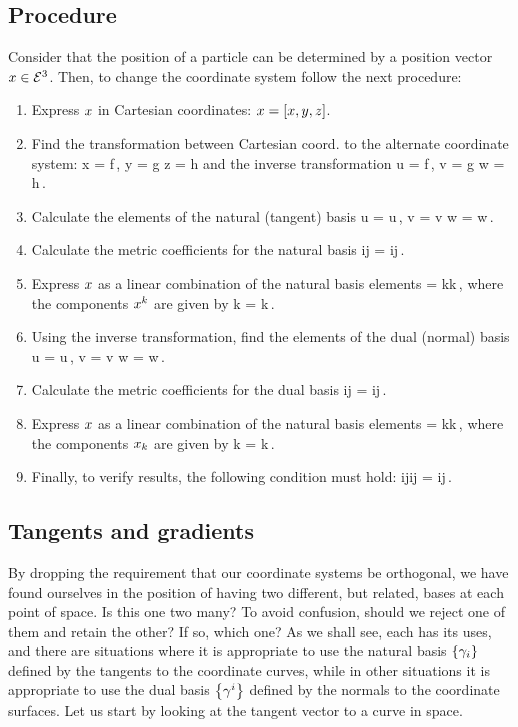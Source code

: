 \subsection{Procedure}
Consider that the position of a particle can be determined by a position vector $x\in\mathcal{E}^{3}$. Then, to change the coordinate system follow the next procedure:
\begin{enumerate}
\item Express $x$ in Cartesian coordinates: $x = \left[{x,y,z}\right]$.
%
\item Find the transformation between Cartesian coord. to the alternate coordinate system:
\beq
x = f\,,\qquad
y = g\qquad{}\qquad
z = h
\eeq
and the inverse transformation
\beq
u = f\,,\qquad
v = g\qquad{}\qquad
w = h\,.
\eeq
%
\item Calculate the elements of the natural (tangent) basis
\beq
\ifvec u = \xpd\pvec u\,,\qquad
\ifvec v = \xpd\pvec v\qquad{}\qquad
\ifvec w = \xpd\pvec w\,.
\eeq
%
\item Calculate the metric coefficients for the natural basis
\beq
\imet ij = \ifvec i\iprod\ifvec j\,.
\eeq
%
\item Express $x$ as a linear combination of the natural basis elements
\beq
\pvec = \comp\pvec k\ifvec k\,,
\eeq
where the components ${x}^{k}$ are given by
\beq
\comp\pvec k = \pvec\iprod\ifvec k\,.
\eeq
%
\item Using the inverse transformation, find the elements of the dual (normal) basis
\beq
\rfvec u = \grad u\,,\qquad
\rfvec v = \grad v\qquad{}\qquad
\rfvec w = \grad w\,.
\eeq
%
\item Calculate the metric coefficients for the dual basis
\beq
\rmet ij = \rfvec i\iprod\rfvec j\,.
\eeq
%
\item Express $x$ as a linear combination of the natural basis elements
\beq
\pvec = \rcomp\pvec k\rfvec k\,,
\eeq
where the components ${x}_{k}$ are given by
\beq
\rcomp\pvec k = \pvec\iprod\rfvec k\,.
\eeq
%
\item Finally, to verify results, the following condition must hold:
\beq
\imet ij\rmet ij = \mkron ij\,.
\eeq
\end{enumerate}


\subsection{Tangents and gradients}
By dropping the requirement that our coordinate systems be orthogonal, we have found ourselves in the position of having two different, but related, bases at each point of space. Is this one two many? To avoid confusion, should we reject one of them and retain the other? If so, which one? As we shall see, each has its uses, and there are situations where it is appropriate to use the natural basis $\left\lbrace{\gamma_{i}}\right\rbrace$ defined by the tangents to the coordinate curves, while in other situations it is appropriate to use the dual basis $\left\lbrace{\gamma^{i}}\right\rbrace$ defined by the normals to the coordinate surfaces. Let us start by looking at the tangent vector to a curve in space.


